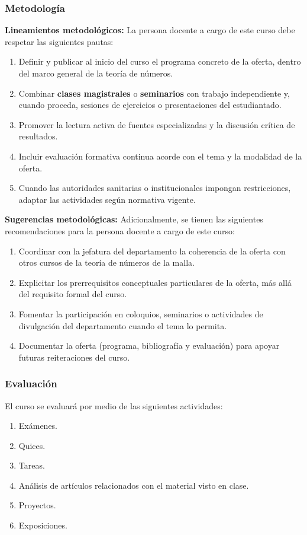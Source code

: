 \begin{refsection}
\subsubsection*{Metodología}

\noindent \textbf{Lineamientos metodológicos:} La persona docente a cargo de este curso debe respetar las siguientes pautas:

\begin{enumerate}
    \item Definir y publicar al inicio del curso el programa concreto de la oferta, dentro del marco general de la teoría de números.
    \item Combinar \textbf{clases magistrales} o \textbf{seminarios} con trabajo independiente y, cuando proceda, sesiones de ejercicios o presentaciones del estudiantado.
    \item Promover la lectura activa de fuentes especializadas y la discusión crítica de resultados.
    \item Incluir evaluación formativa continua acorde con el tema y la modalidad de la oferta.
    \item Cuando las autoridades sanitarias o institucionales impongan restricciones, adaptar las actividades según normativa vigente.
\end{enumerate}

\textbf{Sugerencias metodológicas:} Adicionalmente, se tienen las siguientes recomendaciones para la persona docente a cargo de este curso:

\begin{enumerate}
    \item Coordinar con la jefatura del departamento la coherencia de la oferta con otros cursos de la teoría de números de la malla.
    \item Explicitar los prerrequisitos conceptuales particulares de la oferta, más allá del requisito formal del curso.
    \item Fomentar la participación en coloquios, seminarios o actividades de divulgación del departamento cuando el tema lo permita.
    \item Documentar la oferta (programa, bibliografía y evaluación) para apoyar futuras reiteraciones del curso.
\end{enumerate}

\subsubsection*{Evaluación}

El curso se evaluará por medio de las siguientes actividades:

\begin{enumerate}
\item Exámenes.
\item Quices.
\item Tareas.
\item Análisis de artículos relacionados con el material visto en clase.
\item Proyectos.
\item Exposiciones.
\end{enumerate}

\end{refsection}
